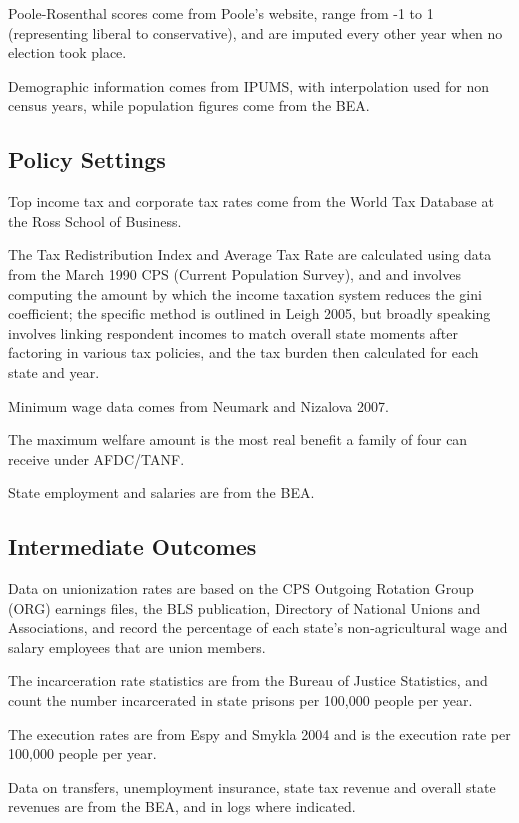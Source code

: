 \documentclass{article}
\begin{document}
Poole-Rosenthal scores come from Poole's website, range from -1 to 1 (representing liberal to conservative), and are imputed every other year when no election took place.

Demographic information comes from IPUMS, with interpolation used for non census years, while population figures come from the BEA.


\subsection{Policy Settings}

Top income tax and corporate tax rates come from the World Tax Database at the Ross School of Business.

The Tax Redistribution Index and Average Tax Rate are calculated using data from the March 1990 CPS (Current Population Survey), and and involves computing the amount by which the income taxation system reduces the gini coefficient; the specific method is outlined in Leigh 2005, but broadly speaking involves linking respondent incomes to match overall state moments after factoring in various tax policies, and the tax burden then calculated for each state and year. 

Minimum wage data comes from Neumark and Nizalova 2007.

The maximum welfare amount is the most real benefit a family of four can receive under AFDC/TANF.

State employment and salaries are from the BEA.

\subsection{Intermediate Outcomes}

Data on unionization rates are based on the CPS Outgoing Rotation Group (ORG) earnings files, the BLS publication, Directory of National Unions and Associations, and record the percentage of each state's non-agricultural wage and salary employees that are union members.

The incarceration rate statistics are from the Bureau of Justice Statistics, and count the number incarcerated in state prisons per 100,000 people per year.

The execution rates are from Espy and Smykla 2004 and is the execution rate per 100,000 people per year.

Data on transfers, unemployment insurance, state tax revenue and overall state revenues are from the BEA, and in logs where indicated.
\end{document}

